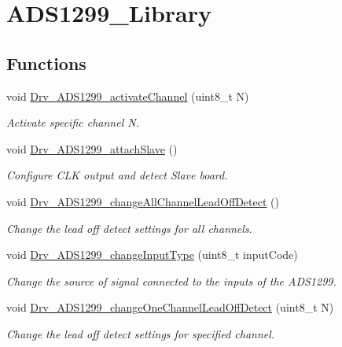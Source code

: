 \hypertarget{group__ADS1299__Library}{}\section{A\+D\+S1299\+\_\+\+Library}
\label{group__ADS1299__Library}
\subsection*{Functions}
\begin{DoxyCompactItemize}
\item 
void \hyperlink{group__ADS1299__Library_ga265dd2d7a4bd35e681d566e3a2c517ce}{Drv\+\_\+\+A\+D\+S1299\+\_\+activate\+Channel} (uint8\+\_\+t N)
\begin{DoxyCompactList}\small\item\em Activate specific channel N. \end{DoxyCompactList}\item 
void \hyperlink{group__ADS1299__Library_ga3da68a8b941049250800fc068c07a601}{Drv\+\_\+\+A\+D\+S1299\+\_\+attach\+Slave} ()
\begin{DoxyCompactList}\small\item\em Configure C\+LK output and detect Slave board. \end{DoxyCompactList}\item 
void \hyperlink{group__ADS1299__Library_gacd21ec90227bde9bcbe7d17924763972}{Drv\+\_\+\+A\+D\+S1299\+\_\+change\+All\+Channel\+Lead\+Off\+Detect} ()
\begin{DoxyCompactList}\small\item\em Change the lead off detect settings for all channels. \end{DoxyCompactList}\item 
void \hyperlink{group__ADS1299__Library_ga1377f541513a9626c05ba013f081cab4}{Drv\+\_\+\+A\+D\+S1299\+\_\+change\+Input\+Type} (uint8\+\_\+t input\+Code)
\begin{DoxyCompactList}\small\item\em Change the source of signal connected to the inputs of the A\+D\+S1299. \end{DoxyCompactList}\item 
void \hyperlink{group__ADS1299__Library_ga7592db204eafa08302261bdaec47020d}{Drv\+\_\+\+A\+D\+S1299\+\_\+change\+One\+Channel\+Lead\+Off\+Detect} (uint8\+\_\+t N)
\begin{DoxyCompactList}\small\item\em Change the lead off detect settings for specified channel. \end{DoxyCompactList}\item 

\end{DoxyCompactItemize}
